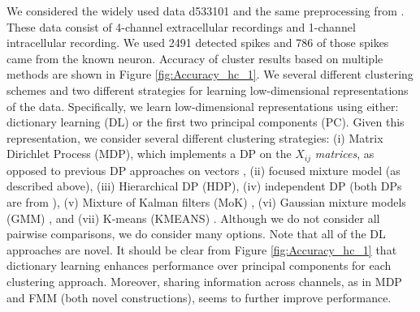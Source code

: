 \documentclass[journal]{IEEEtran}
\begin{document}
We considered
the widely used data d533101 and the same
preprocessing from \cite{Calabrese2010}.
  These data consist of 4-channel extracellular recordings and 1-channel
  intracellular recording.  We used 2491 detected spikes and 786 of those
  spikes came from the known neuron. Accuracy of cluster results based on multiple methods are shown in Figure \ref{fig:Accuracy_hc_1}. 
We several different clustering schemes and two different strategies for learning low-dimensional representations of the data.  Specifically, we learn low-dimensional representations using either: dictionary learning (DL) or the first two principal components (PC).  Given this representation, we consider several different clustering strategies: (i) Matrix Dirichlet Process (MDP), which implements a DP on the $X_{ij}$ \emph{matrices}, as opposed to previous DP approaches on vectors \cite{Wood2009, Bo2011}, (ii) focused mixture model (as described above), (iii) Hierarchical DP (HDP), (iv) independent DP (both DPs are from \cite{Bo2011}), (v) Mixture of Kalman filters (MoK) \cite{Calabrese2010}, (vi) Gaussian mixture models (GMM) \cite{bishop2006}, and (vii) K-means (KMEANS) \cite{??}.  Although we do not consider all pairwise comparisons, we do consider many options.  Note that all of the DL approaches are novel.  It should be clear from Figure \ref{fig:Accuracy_hc_1} that dictionary learning enhances performance over principal components for each clustering approach.  Moreover, sharing information across channels, as in MDP and FMM (both novel constructions), seems to further improve performance.


\end{document}
